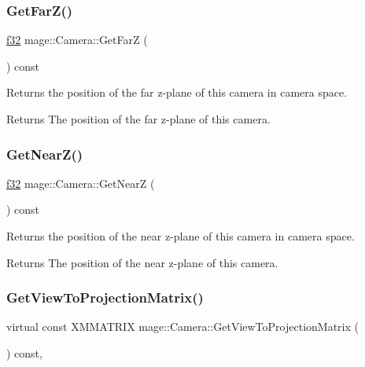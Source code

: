 \subsubsection{\texorpdfstring{Get\+Far\+Z()}{GetFarZ()}}
{\footnotesize\ttfamily \hyperlink{namespacemage_a6a44ad388483959dc4dff9f2aef91431}{f32} mage\+::\+Camera\+::\+Get\+FarZ (\begin{DoxyParamCaption}{ }\end{DoxyParamCaption}) const\hspace{0.3cm}{\ttfamily [noexcept]}}

Returns the position of the far z-\/plane of this camera in camera space.

\begin{DoxyReturn}{Returns}
The position of the far z-\/plane of this camera. 
\end{DoxyReturn}
\hypertarget{classmage_1_1_camera_ae1af2a2f2e6ba144c75b1b75ca64c8da}{}\label{classmage_1_1_camera_ae1af2a2f2e6ba144c75b1b75ca64c8da} 
\subsubsection{\texorpdfstring{Get\+Near\+Z()}{GetNearZ()}}
{\footnotesize\ttfamily \hyperlink{namespacemage_a6a44ad388483959dc4dff9f2aef91431}{f32} mage\+::\+Camera\+::\+Get\+NearZ (\begin{DoxyParamCaption}{ }\end{DoxyParamCaption}) const\hspace{0.3cm}{\ttfamily [noexcept]}}

Returns the position of the near z-\/plane of this camera in camera space.

\begin{DoxyReturn}{Returns}
The position of the near z-\/plane of this camera. 
\end{DoxyReturn}
\hypertarget{classmage_1_1_camera_ad3e8380ba9718a983f72d753d08f556e}{}\label{classmage_1_1_camera_ad3e8380ba9718a983f72d753d08f556e} 
\subsubsection{\texorpdfstring{Get\+View\+To\+Projection\+Matrix()}{GetViewToProjectionMatrix()}}
{\footnotesize\ttfamily virtual const X\+M\+M\+A\+T\+R\+IX mage\+::\+Camera\+::\+Get\+View\+To\+Projection\+Matrix (\begin{DoxyParamCaption}{ }\end{DoxyParamCaption}) const\hspace{0.3cm}{\ttfamily [pure virtual]}, {\ttfamily [noexcept]}}

